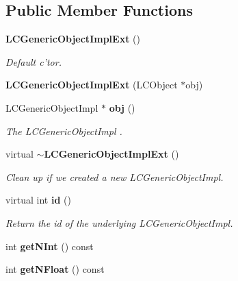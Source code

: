 \subsection*{Public Member Functions}
\begin{DoxyCompactItemize}
\item 
{\bf LCGenericObjectImplExt} ()\label{classCALICE_1_1LCGenericObjectImplExt_aa3a6bb969c7cc736d88587960b663cba}

\begin{DoxyCompactList}\small\item\em Default c'tor. \item\end{DoxyCompactList}\item 
{\bfseries LCGenericObjectImplExt} (LCObject $\ast$obj)\label{classCALICE_1_1LCGenericObjectImplExt_a5e58ebbd98f49efeee560fd6bda8aae4}

\item 
LCGenericObjectImpl $\ast$ {\bf obj} ()
\begin{DoxyCompactList}\small\item\em The LCGenericObjectImpl . \item\end{DoxyCompactList}\item 
virtual {\bf $\sim$LCGenericObjectImplExt} ()\label{classCALICE_1_1LCGenericObjectImplExt_a6326844158718441a0e984402e9c2f8b}

\begin{DoxyCompactList}\small\item\em Clean up if we created a new LCGenericObjectImpl. \item\end{DoxyCompactList}\item 
virtual int {\bf id} ()\label{classCALICE_1_1LCGenericObjectImplExt_a13e336bf7a902820651dadb79271cd37}

\begin{DoxyCompactList}\small\item\em Return the id of the underlying LCGenericObjectImpl. \item\end{DoxyCompactList}\item 
int {\bfseries getNInt} () const \label{classCALICE_1_1LCGenericObjectImplExt_aee1c6e2485d45b6dcba643210f840224}

\item 
int {\bfseries getNFloat} () const \label{classCALICE_1_1LCGenericObjectImplExt_a09d41f70b6a4894b0f79806c32ead2b3}


\end{DoxyCompactItemize}
